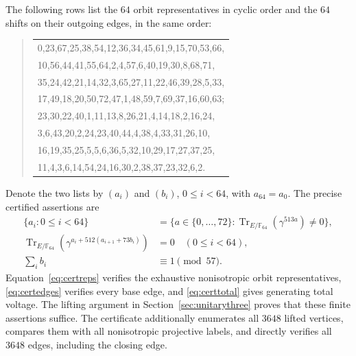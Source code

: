 \documentclass[11pt]{article}
\theoremstyle{definition}
\newcommand{\F}{\mathbb F}
\newcommand{\Tr}{\operatorname{Tr}}
\begin{document}
The following rows list the $64$ orbit representatives in cyclic order and the $64$ shifts on their outgoing edges, in the same order:
\begin{quote}\small\ttfamily
\begin{tabular}{@{}l@{}}
0,23,67,25,38,54,12,36,34,45,61,9,15,70,53,66,\\
10,56,44,41,55,64,2,4,57,6,40,19,30,8,68,71,\\
35,24,42,21,14,32,3,65,27,11,22,46,39,28,5,33,\\
17,49,18,20,50,72,47,1,48,59,7,69,37,16,60,63;\\[1mm]
23,30,22,40,1,11,13,8,26,21,4,14,18,2,16,24,\\
3,6,43,20,2,24,23,40,44,4,38,4,33,31,26,10,\\
16,19,35,25,5,5,6,36,5,32,10,29,17,27,37,25,\\
11,4,3,6,14,54,24,16,30,2,38,37,23,32,6,2.
\end{tabular}
\end{quote}
Denote the two lists by $(a_i)$ and $(b_i)$, $0\le i<64$, with $a_{64}=a_0$. The precise certified assertions are
\begin{align}
\{a_i:0\le i<64\}
&=\{a\in\{0,\ldots,72\}:\Tr_{E/\F_{64}}(\gamma^{513a})\ne0\},\label{eq:certreps}\\
\Tr_{E/\F_{64}}(\gamma^{a_i+512(a_{i+1}+73b_i)})&=0\quad(0\le i<64),\label{eq:certedges}\\
\sum_i b_i&\equiv1\pmod{57}.\label{eq:certtotal}
\end{align}
Equation~\eqref{eq:certreps} verifies the exhaustive nonisotropic orbit representatives, \eqref{eq:certedges} verifies every base edge, and \eqref{eq:certtotal} gives generating total voltage. The lifting argument in Section~\ref{sec:unitarythree} proves that these finite assertions suffice. The certificate additionally enumerates all $3648$ lifted vertices, compares them with all nonisotropic projective labels, and directly verifies all $3648$ edges, including the closing edge.
\end{document}
